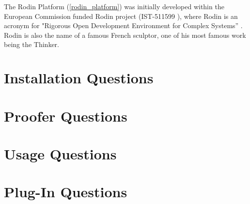 The Rodin Platform (\ref{rodin_platform}) was initially developed within the European Commission funded Rodin project (IST-511599 ), where Rodin is an acronym for "Rigorous Open Development Environment for Complex Systems” . Rodin is also the name of a famous French sculptor, one of his most famous work being the Thinker. 

\section{Installation Questions}

\section{Proofer Questions}

\section{Usage Questions}

\section{Plug-In Questions}
